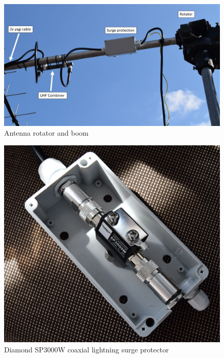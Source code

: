 \begin{figure}
    \centering
    \includegraphics[width=0.75\paperwidth]{img/7/elka_antenna_rotator.jpg}
    \caption{Antenna rotator and boom}
    \label{elka_antenna_rotator}
\end{figure}

\begin{figure}
    \centering
    \includegraphics[width=0.5\paperwidth]{img/7/coax_surge_protection.jpg}
    \caption{Diamond SP3000W coaxial lightning surge protector}
    \label{coax_surge_protection}
\end{figure}



